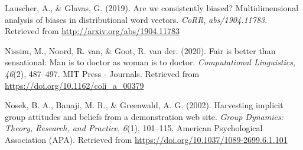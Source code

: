 \documentclass[10pt,dvipsnames,enabledeprecatedfontcommands]{scrartcl}
\begin{document}
\hypertarget{ref-Lauscher2019multidimensional}{}
Lauscher, A., \& Glavas, G. (2019). Are we consistently biased?
Multidimensional analysis of biases in distributional word vectors.
\emph{CoRR}, \emph{abs/1904.11783}. Retrieved from
\url{http://arxiv.org/abs/1904.11783}

\hypertarget{ref-Nissim2020fair}{}
Nissim, M., Noord, R. van, \& Goot, R. van der. (2020). Fair is better
than sensational: Man is to doctor as woman is to doctor.
\emph{Computational Linguistics}, \emph{46}(2), 487--497. MIT Press -
Journals. Retrieved from \url{https://doi.org/10.1162/coli_a_00379}

\hypertarget{ref-Nosek2002harvesting}{}
Nosek, B. A., Banaji, M. R., \& Greenwald, A. G. (2002). Harvesting
implicit group attitudes and beliefs from a demonstration web site.
\emph{Group Dynamics: Theory, Research, and Practice}, \emph{6}(1),
101--115. American Psychological Association (APA). Retrieved from
\url{https://doi.org/10.1037/1089-2699.6.1.101}
\end{document}
